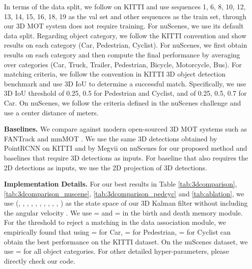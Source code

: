 \documentclass[letterpaper, 10 pt, conference]{ieeeconf}
\begin{document}
In terms of the data split, we follow \cite{Scheidegger2018} on KITTI and use sequences 1, 6, 8, 10, 12, 13, 14, 15, 16, 18, 19 as the val set and other sequences as the train set, through our 3D MOT system does not require training. For nuScenes, we use its default data split. Regarding object category, we follow the KITTI convention and show results on each category (Car, Pedestrian, Cyclist). For nuScenes, we first obtain results on each category and then compute the final performance by averaging over  categories (Car, Truck, Trailer, Pedestrian, Bicycle, Motorcycle, Bus). For matching criteria, we follow the convention in KITTI 3D object detection benchmark and use 3D IoU to determine a successful match. Specifically, we use 3D IoU threshold  of 0.25, 0.5 for Pedestrian and Cyclist, and  of 0.25, 0.5, 0.7 for Car. On nuScenes, we follow the criteria defined in the nuScenes challenge and use a center distance  of  meters.

\vspace{1.5mm}\noindent\textbf{Baselines.} We compare against modern open-sourced 3D MOT systems such as FANTrack \cite{Baser2019} and mmMOT \cite{Zhang2019}. We use the same 3D detections obtained by PointRCNN \cite{Shi2019} on KITTI and by Megvii \cite{Zhu2019} on nuScenes for our proposed method and baselines \cite{Baser2019,Zhang2019} that require 3D detections as inputs. For baseline \cite{Baser2019} that also requires the 2D detections as inputs, we use the 2D projection of 3D detections. 

\vspace{1.5mm}\noindent\textbf{Implementation Details.} For our best results in Table \ref{tab:3dcomparison}, \ref{tab:3dcomparison_nuscene}, \ref{tab:3dcomparison_pedcyc} and \ref{tab:ablation}, we use (, , , , , , , , , , ) as the state space of our 3D Kalman filter without including the angular velocity . We use = and = in the birth and death memory module. For the threshold to reject a matching in the data association module, we empirically found that using = for Car, = for Pedestrian, = for Cyclist can obtain the best performance on the KITTI dataset. On the nuScenes dataset, we use = for all object categories. For other detailed hyper-parameters, please directly check our code.
\end{document}
